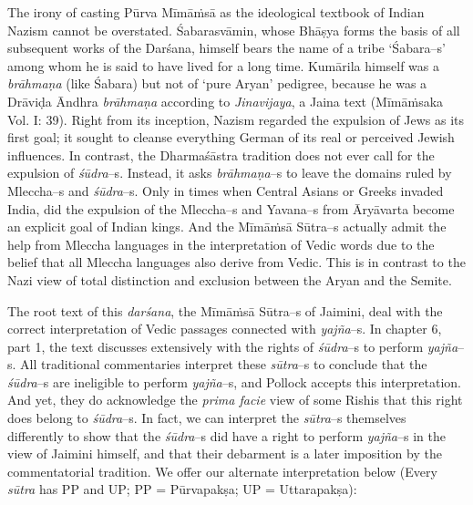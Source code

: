 The irony of casting Pūrva Mīmāṁsā as the ideological textbook of Indian Nazism cannot be overstated. Śabarasvāmin, whose Bhāṣya forms the basis of all subsequent works of the Darśana, himself bears the name of a tribe ‘Śabara–s’ among whom he is said to have lived for a long time. Kumārila himself was a \textit{brāhmaṇa} (like Śabara) but not of ‘pure Aryan’ pedigree, because he was a Drāviḍa Āndhra \textit{brāhmaṇa} according to \textit{Jinavijaya}, a Jaina text (Mīmāṁsaka Vol. I: 39). Right from its inception, Nazism regarded the expulsion of Jews as its first goal; it sought to cleanse everything German of its real or perceived Jewish influences. In contrast, the Dharmaśāstra tradition does not ever call for the expulsion of \textit{śūdra}–s. Instead, it asks \textit{brāhmaṇa}–s to leave the domains ruled by Mleccha–s and \textit{śūdra}–s. Only in times when Central Asians or Greeks invaded India, did the expulsion of the Mleccha–s and Yavana–s from Āryāvarta become an explicit goal of Indian kings. And the Mīmāṁsā Sūtra–s actually admit the help from Mleccha languages in the interpretation of Vedic words due to the belief that all Mleccha languages also derive from Vedic. This is in contrast to the Nazi view of total distinction and exclusion between the Aryan and the Semite.

The root text of this \textit{darśana}, the Mīmāṁsā Sūtra–s of Jaimini, deal with the correct interpretation of Vedic passages connected with \textit{yajña}–s. In chapter 6, part 1, the text discusses extensively with the rights of \textit{śūdra}–s to perform \textit{yajña}–s. All traditional commentaries interpret these \textit{sūtra}–s to conclude that the \textit{śūdra}–s are ineligible to perform \textit{yajña}–s, and Pollock accepts this interpretation. And yet, they do acknowledge the \textit{prima facie} view of some Rishis that this right does belong to \textit{śūdra}–s. In fact, we can interpret the \textit{sūtra}–s themselves differently to show that the \textit{śūdra}–s did have a right to perform \textit{yajña}–s in the view of Jaimini himself, and that their debarment is a later imposition by the commentatorial tradition. We offer our alternate interpretation below (Every \textit{sūtra} has PP and UP; PP = Pūrvapakṣa; UP = Uttarapakṣa):

